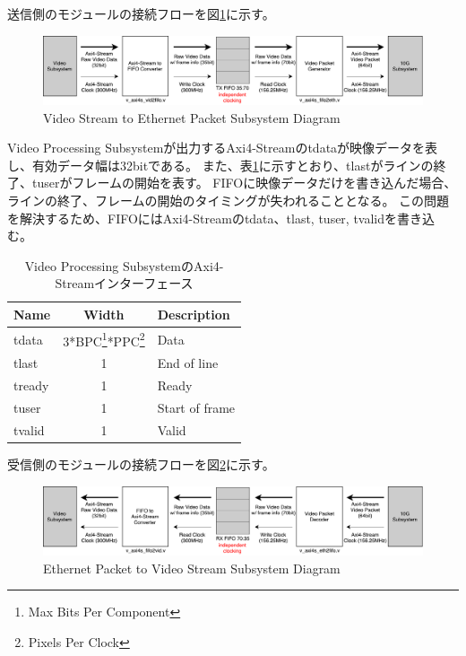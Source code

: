 送信側のモジュールの接続フローを図\ref{fig:fpga-video-ethernet-diagram}に示す。

\begin{figure}[htbp]
  \begin{center}
    \includegraphics[bb=0 0 911 166,width=15.5cm]{img/fpga-video-ethernet-diagram.pdf}
  \end{center}
  \caption{Video Stream to Ethernet Packet Subsystem Diagram}
  \label{fig:fpga-video-ethernet-diagram}
\end{figure}

Video Processing Subsystemが出力するAxi4-Streamのtdataが映像データを表し、有効データ幅は32bitである。
また、表\ref{tb:fpga-axi4-stream}に示すとおり、tlastがラインの終了、tuserがフレームの開始を表す。
FIFOに映像データだけを書き込んだ場合、ラインの終了、フレームの開始のタイミングが失われることとなる。
この問題を解決するため、FIFOにはAxi4-Streamのtdata、tlast, tuser, tvalidを書き込む。

\begin{table}[htbp]
  \caption{Video Processing SubsystemのAxi4-Streamインターフェース}
  \label{tb:fpga-axi4-stream}
  \begin{center}
  \begin{tabular}{l|c|l}
    \hline
    Name   & Width     & Description \\\hline\hline
    tdata  & 3*BPC\footnote{Max Bits Per Component}*PPC\footnote{Pixels Per Clock} & Data \\\hline
    tlast  & 1         & End of line \\\hline
    tready & 1         & Ready \\\hline
    tuser  & 1         & Start of frame \\\hline
    tvalid & 1         & Valid \\\hline
  \end{tabular}\end{center}
\end{table}


受信側のモジュールの接続フローを図\ref{fig:fpga-ethernet-video-diagram}に示す。

\begin{figure}[htbp]
  \begin{center}
    \includegraphics[bb=0 0 911 166,width=15.5cm]{img/fpga-ethernet-video-diagram.pdf}
  \end{center}
  \caption{Ethernet Packet to Video Stream Subsystem Diagram}
  \label{fig:fpga-ethernet-video-diagram}
\end{figure}

